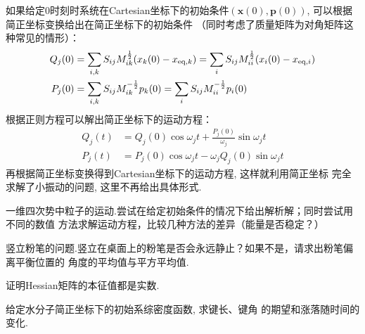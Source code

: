     \splitline

    如果给定0时刻时系统在Cartesian坐标下的初始条件$(\bm{x}(0),\bm{p}(0))$, 
    可以根据简正坐标变换给出在简正坐标下的初始条件
    （同时考虑了质量矩阵为对角矩阵这种常见的情形）：
    \begin{equation}
        \begin{aligned}
            Q_j(0) &=\sum_{i,k} S_{ij} M^{\frac{1}{2}}_{ik}(x_k(0) - x_{\mathrm{eq},k}) =\sum_i S_{ij} M_{ii}^{\frac 12} (x_i(0) - x_{\mathrm{eq},i})\\
            P_j(0) &=\sum_{i,k} S_{ij} M^{-\frac{1}{2}}_{ik}p_k(0)=\sum_i S_{ij} M_{ii}^{-\frac 12} p_{i}(0)
        \end{aligned}
    \end{equation}
    根据正则方程可以解出简正坐标下的运动方程：
    \begin{equation}
        \begin{aligned}
            Q_j(t) &= Q_j(0)\cos{\omega_j t} + \frac{P_j(0)}{\omega_j} \sin{\omega_j t}\\
            P_j(t) &= P_j(0)\cos{\omega_j t} - \omega_j Q_j(0) \sin{\omega_j t}
        \end{aligned}
    \end{equation}
    再根据简正坐标变换得到Cartesian坐标下的运动方程, 这样就利用简正坐标
    完全求解了小振动的问题, 这里不再给出具体形式.

    \begin{asg}
        一维四次势中粒子的运动.尝试在给定初始条件的情况下给出解析解；同时尝试用不同的数值
        方法求解运动方程，比较几种方法的差异（能量是否稳定？）
    \end{asg}
    \begin{asg}
        竖立粉笔的问题.竖立在桌面上的粉笔是否会永远静止？如果不是，请求出粉笔偏离平衡位置的
        角度的平均值与平方平均值.
    \end{asg}
    \begin{asg}
        证明Hessian矩阵的本征值都是实数.
    \end{asg}
    \begin{asg}
        给定水分子简正坐标下的初始系综密度函数, 求键长、键角
        的期望和涨落随时间的变化.
    \end{asg}
    
    
    
